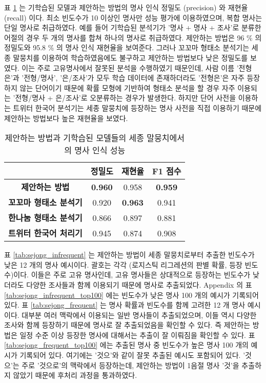 \documentclass[oneside, ko,phd]{snuthesis_utf8_kor}
\begin{document}
표 \ref{tab:sejong_performance} 는 기학습된 모델과 제안하는 방법의 명사 인식 정밀도 (precision) 와 재현율 (recall) 이다.
최소 빈도수가 10 이상인 명사만 성능 평가에 이용하였으며, 복합 명사는 단일 명사로 취급하였다.
예를 들어 기학습된 분석기가 '명사 + 명사 + 조사'로 분류한 어절의 경우 두 개의 명사를 합쳐 하나의 명사로 취급하였다.
제안하는 방법은 96 \% 의 정밀도와 95.8 \% 의 명사 인식 재현율을 보여준다.
그러나 꼬꼬마 형태소 분석기는 세종 말뭉치를 이용하여 학습하였음에도 불구하고 제안하는 방법보다 낮은 정밀도를 보였다.
이는 주로 고유명사에서 잘못된 분석을 수행하였기 때문인데, 사람 이름 '전형은'과 '전형/명사', '은/조사'가 모두 학습 데이터에 존재하더라도 '전형은'은 자주 등장하지 않는 단어이기 때문에 확률 모형에 기반하여 형태소 분석을 할 경우 자주 이용되는 '전형/명사 + 은/조사'로 오분류하는 경우가 발생한다.
하지만 단어 사전을 이용하는 트위터 한국어 분석기는 세종 말뭉치에 등장하는 명사 사전을 직접 이용하기 때문에 제안하는 방법보다 높은 재현율을 보였다.

\begin{table}[ht]
\centering
\caption{제안하는 방법과 기학습된 모델들의 세종 말뭉치에서의 명사 인식 성능}
\label{tab:sejong_performance}
\begin{tabular}{|
>{}c |c|c|c|}\hline
& \textbf{정밀도} & \textbf{재현율} & \textbf{F1 점수} \\ \hline
\textbf{제안하는 방법} & {\textbf{0.960}} & 0.958 & { \textbf{0.959}} \\ \hline
\textbf{꼬꼬마 형태소 분석기} & 0.920 & { \textbf{0.963}} & 0.941 \\ \hline
\textbf{한나눔 형태소 분석기} & 0.866 & 0.897 & 0.881 \\ \hline
\textbf{트위터 한국어 처리기} & 0.945 & 0.874 & 0.908 \\ \hline
\end{tabular}%
\end{table}

표 \ref{tab:sejong_infrequent} 는 제안하는 방법이 세종 말뭉치로부터 추출한 빈도수가 낮은 12 개의 명사 예시이다.
괄호는 각각 (로지스틱 리그레션의 판별 확률, 등장 빈도수)이다.
이들은 주로 고유 명사인데, 고유 명사들은 상대적으로 등장하는 빈도수가 낮더라도 다양한 조사들과 함께 이용되기 때문에 명사로 추출되었다.
Appendix 의 표 \ref{tab:sejong_infrequent_top100} 에는 빈도수가 낮은 명사 100 개의 예시가 기록되어 있다.
표 \ref{tab:sejong_frequent} 는 명사 확률과 빈도수를 함께 고려한 12 개 명사 예시이다.
대부분 여러 맥락에서 이용되는 일반 명사들이 추출되었으며, 이들 역시 다양한 조사와 함께 등장하기 때문에 명사로 잘 추출되었음을 확인할 수 있다.
즉 제안하는 방법은 일정 수준 이상 등장한 명사에 대해서는 추출이 잘 이뤄짐을 확인할 수 있다.
표 \ref{tab:sejong_frequent_top100} 에는 추출된 명사 중 빈도수가 높은 명사 100 개의 예시가 기록되어 있다.
여기에는 '것으'와 같이 잘못 추출된 예시도 포함되어 있다.
'것으'는 주로 '것으로'의 맥락에서 등장하는데, 제안하는 방법이 1음절 명사 '것'을 추출하지 않았기 때문에 후처리 과정을 통과하였다.
\end{document}
